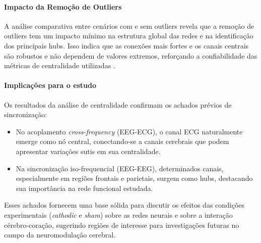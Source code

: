 \paragraph{Impacto da Remoção de Outliers}  
A análise comparativa entre cenários com e sem outliers revela que a remoção de outliers tem um impacto mínimo na estrutura global das redes e na identificação dos principais hubs. Isso indica que as conexões mais fortes e os canais centrais são robustos e não dependem de valores extremos, reforçando a confiabilidade das métricas de centralidade utilizadas \cite{newman2010networks}.

\paragraph{Implicações para o estudo} 

Os resultados da análise de centralidade confirmam os achados prévios de sincronização:

\begin{itemize}
    \item No acoplamento \emph{cross-frequency} (EEG-ECG), o canal ECG naturalmente emerge como nó central, conectando-se a canais cerebrais que podem apresentar variações sutis em sua centralidade.
    \item Na sincronização iso-frequencial (EEG-EEG), determinados canais, especialmente em regiões frontais e parietais, surgem como hubs, destacando sua importância na rede funcional estudada.
\end{itemize}

Esses achados fornecem uma base sólida para discutir os efeitos das condições experimentais (\emph{cathodic} e \emph{sham}) sobre as redes neurais e sobre a interação cérebro-coração, sugerindo regiões de interesse para investigações futuras no campo da neuromodulação cerebral.